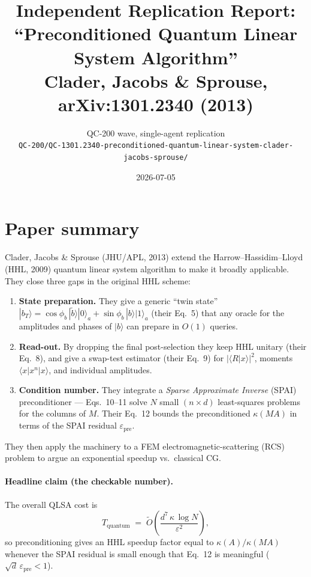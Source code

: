 \documentclass[11pt]{article}
\title{Independent Replication Report:\\
       ``Preconditioned Quantum Linear System Algorithm''\\
       \large Clader, Jacobs \& Sprouse, arXiv:1301.2340 (2013)}
\author{QC-200 wave, single-agent replication\\
        \texttt{QC-200/QC-1301.2340-preconditioned-quantum-linear-system-clader-jacobs-sprouse/}}
\date{2026-07-05}
\begin{document}
\maketitle

\begin{center}
\end{center}

\section{Paper summary}

Clader, Jacobs \& Sprouse (JHU/APL, 2013) extend the Harrow--Hassidim--Lloyd
(HHL, 2009) quantum linear system algorithm to make it broadly applicable.
They close three gaps in the original HHL scheme:
\begin{enumerate}
  \item \textbf{State preparation.} They give a generic ``twin state''
        $|b_T\rangle = \cos\phi_b\,|\tilde b\rangle|0\rangle_a
                     + \sin\phi_b\,|b\rangle|1\rangle_a$
        (their Eq.~5) that any oracle for the amplitudes and phases of
        $|b\rangle$ can prepare in $O(1)$ queries.
  \item \textbf{Read-out.} By dropping the final post-selection they
        keep HHL unitary (their Eq.~8), and give a swap-test estimator
        (their Eq.~9) for $|\langle R | x\rangle|^{2}$, moments
        $\langle x|x^{n}|x\rangle$, and individual amplitudes.
  \item \textbf{Condition number.} They integrate a
        \emph{Sparse Approximate Inverse} (SPAI) preconditioner
        --- Eqs.~10--11 solve $N$ small $(n\times d)$ least-squares
        problems for the columns of $M$. Their Eq.~12 bounds the
        preconditioned $\kappa(MA)$ in terms of the SPAI residual
        $\varepsilon_{\mathrm{pre}}$.
\end{enumerate}
They then apply the machinery to a FEM electromagnetic-scattering
(RCS) problem to argue an exponential speedup vs.\ classical CG.

\paragraph{Headline claim (the checkable number).}
The overall QLSA cost is
\[
T_{\text{quantum}} \;=\; \tilde O\!\left(\frac{d^{7}\,\kappa\,\log N}{\varepsilon^{2}}\right) ,
\]
so preconditioning gives an HHL speedup factor equal to $\kappa(A)/\kappa(MA)$
whenever the SPAI residual is small enough that Eq.~12 is meaningful
($\sqrt d\,\varepsilon_{\mathrm{pre}} < 1$).
\end{document}
